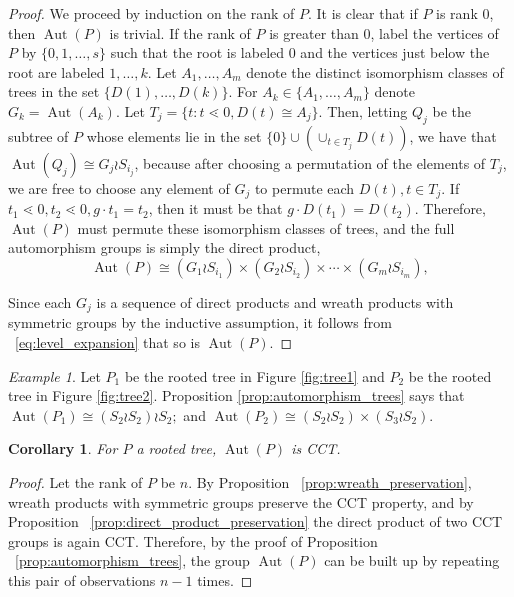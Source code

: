 \documentclass[smallextended, envcountsame, numbook]{svjour3}
\theoremstyle{plain}
\newtheorem{cor}[thm]{Corollary}
\theoremstyle{definition}
\theoremstyle{remark}
\newtheorem{eg}[thm]{Example}
\numberwithin{equation}{section}
\newcommand\Aut{\operatorname{Aut}}
\begin{document}
\begin{proof}
We proceed by induction on the rank of $P$.  It is clear that if $P$ is rank 0, then $\Aut(P)$ is trivial.  If the rank of $P$ is greater than 0, label the vertices of $P$ by $\{0,1,\ldots, s\}$ such that the root is labeled $0$ and the vertices just below the root are labeled $1, \ldots, k$. Let $A_1,\ldots, A_m$ denote the distinct isomorphism classes of trees in the set $\{D(1),\ldots, D(k)\}$. For $A_k \in \{A_1,\ldots,A_m\}$ denote $G_k = \Aut(A_k)$. 
Let $T_j = \{t\colon t\lessdot 0,D(t) \cong A_j\}$. Then, letting $Q_j$ be the subtree of $P$ whose elements lie in the set $\{0\} \cup (\cup_{t \in T_j} D(t))$, we have that $\Aut(Q_j) \cong G_j \wr S_{i_j}$, because after choosing a permutation of the elements of $T_j$, we are free to choose any element of $G_j$ to permute each $D(t),t \in T_j$. If $t_1 \lessdot 0,t_2 \lessdot 0,g \cdot t_1 = t_2$, then it must be that $g \cdot D(t_1) = D(t_2)$. Therefore, $\Aut(P)$ must permute these isomorphism classes of trees, and the full automorphism groups is simply the direct product, 
\begin{equation}
\Aut(P) \cong (G_1 \wr S_{i_1}) \times (G_2 \wr S_{i_2}) \times \cdots \times (G_m\wr S_{i_m}),
\end{equation}

Since each $G_j$ is a sequence of direct products and wreath products with symmetric groups by the inductive assumption, it follows from ~\eqref{eq:level_expansion} that so is $\Aut(P)$.
\end{proof}

\begin{eg}
Let $P_1$ be the rooted tree in Figure \ref{fig:tree1} and $P_2$ be the rooted tree in Figure \ref{fig:tree2}.  Proposition \ref{prop:automorphism_trees} says that $\Aut (P_1) \cong (S_2 \wr S_2)\wr S_2;$ and $\Aut(P_2) \cong (S_2 \wr S_2) \times (S_3 \wr S_2) $. 
\end{eg}

\begin{cor}
\label{cor:tree_cct}
For $P$ a rooted tree, $\Aut(P)$ is CCT.
\end{cor}
\begin{proof}
Let the rank of $P$ be $n$. By Proposition ~\ref{prop:wreath_preservation}, wreath products with symmetric groups preserve the CCT property, and by Proposition ~\ref{prop:direct_product_preservation} the direct product of two CCT groups is again CCT. Therefore, by the proof of Proposition ~\ref{prop:automorphism_trees}, the group $\Aut(P)$ can be built up by repeating this pair of observations $n-1$ times.
\end{proof}
\end{document}
